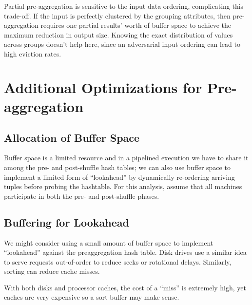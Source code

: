 \documentclass[12pt]{article}
\begin{document}
Partial pre-aggregation is sensitive to the input data ordering, complicating
this trade-off.  If the input is perfectly clustered by the grouping
attributes, then pre-aggregation requires one partial results' worth of buffer
space to achieve the maximum reduction in output size.  Knowing the exact
distribution of values across groups doesn't help here, since an adversarial
input ordering can lead to high eviction rates.

\section{Additional Optimizations for Pre-aggregation}

\subsection{Allocation of Buffer Space}
Buffer space is a limited resource and in a pipelined execution we have to share it among the pre- and post-shuffle hash tables; we can also use buffer space to implement a limited form of ``lookahead'' by dynamically re-ordering arriving tuples before probing the hashtable.  For this analysis, assume that all machines participate in both the pre- and post-shuffle phases.


\subsection{Buffering for Lookahead}

We might consider using a small amount of buffer space to implement ``lookahead'' against the preaggregation hash table.
Disk drives use a similar idea to serve requests out-of-order to reduce seeks or rotational delays.
Similarly, sorting can reduce cache misses.

With both disks and processor caches, the cost of a ``miss'' is extremely high, yet caches are very expensive so a sort buffer may make sense.
\end{document}

